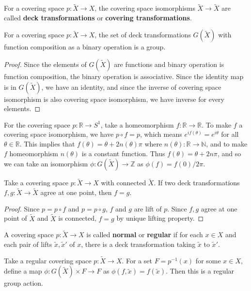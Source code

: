 \begin{defn} For a covering space $p:\tilde{X}\rightarrow X$, the covering space isomorphisms $\tilde{X}\rightarrow \tilde{X}$ are called \textbf{deck transformations} or \textbf{covering transformations}.
\end{defn}
\begin{prop} For a covering space $p:\tilde{X}\rightarrow X$, the set of deck transformations $G(\tilde{X})$ with function composition as a binary operation is a group.
\end{prop}
\begin{proof}
Since the elements of $G(\tilde{X})$ are functions and binary operation is function composition, the binary operation is associative. Since the identity map is in $G(\tilde{X})$, we have an identity, and since the inverse of covering space isomorphism is also covering space isomorphism, we have inverse for every elements.
\end{proof}
\begin{exmp} For the covering space $p:\mathbb{R}\rightarrow S^1$, take a homeomorphism $f:\mathbb{R}\rightarrow \mathbb{R}$. To make $f$ a covering space isomorphism, we have $p\circ f=p$, which means $e^{if(\theta)}=e^{i\theta}$ for all $\theta\in \mathbb{R}$. This implies that $f(\theta)=\theta+2n(\theta)\pi$ where $n(\theta):\mathbb{R}\rightarrow \mathbb{N}$, and to make $f$ homeomorphism $n(\theta)$ is a constant function. Thus $f(\theta)=\theta+2n\pi$, and so we can take an isomorphism $\phi:G(\tilde{X})\rightarrow \mathbb{Z}$ as $\phi(f)=f(0)/2\pi$.
\end{exmp}
\begin{prop} Take a covering space $p:\tilde{X}\rightarrow X$ with connected $\tilde{X}$. If two deck transformations $f,g:\tilde{X}\rightarrow \tilde{X}$ agree at one point, then $f=g$.
\end{prop}
\begin{proof}
Since $p=p\circ f$ and $p=p\circ g$, $f$ and $g$ are lift of $p$. Since $f,g$ agree at one point of $\tilde{X}$ and $\tilde{X}$ is connected, $f=g$ by unique lifting property.
\end{proof}
\begin{defn} A covering space $p:\tilde{X}\rightarrow X$ is called \textbf{normal} or \textbf{regular} if for each $x\in X$ and each pair of lifts $\tilde{x},\tilde{x}'$ of $x$, there is a deck transformation taking $\tilde{x}$ to $\tilde{x}'$.
\end{defn}
\begin{prop} Take a regular covering space $p:\tilde{X}\rightarrow X$. For a set $F=p^{-1}(x)$ for some $x\in X$, define a map $\phi:G(\tilde{X})\times F\rightarrow F$ as $\phi(f,\tilde{x})=f(\tilde{x})$. Then this is a regular group action.
\end{prop}
